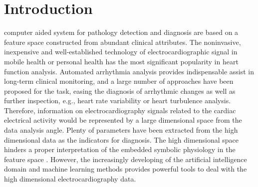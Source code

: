\documentclass[journal]{IEEEtran}
\begin{document}
\section{Introduction}
% 
% 
% 
% 
 computer aided system for pathology detection and diagnosis are based on a feature space constructed from abundant clinical attributes.
The noninvasive, inexpensive and well-established technology of electrocardiographic signal in mobile health or personal health has the most significant popularity in heart function analysis. 
Automated arrhythmia analysis provides indispensable assist in long-term clinical monitoring, and a large number of approaches have been proposed for the task, easing the diagnosis of arrhythmic changes as well as further inspection, e.g., heart rate variability or heart turbulence analysis.
Therefore, information on electrocardiography signals related to the cardiac electrical activity would be represented by a large dimensional space from the data analysis angle.
Plenty of parameters have been extracted from the high dimensional data as the indicators for diagnosis. 
The high dimensional space hinders a proper interpretation of the embedded symbolic physiology in the feature space \cite{delgado2009dimensionality}.
However, the increasingly developing of the artificial intelligence domain and machine learning methods provides powerful tools to deal with the high dimensional electrocardiography data.
\end{document}
